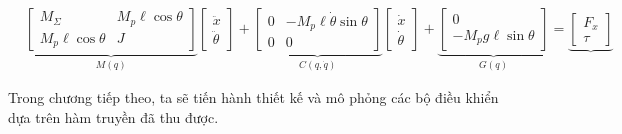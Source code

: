            \begin{align*}
                &\underbrace{
                \begin{bmatrix}
                M_\Sigma & M_p \ell \cos \theta\\
                M_p \ell  \cos \theta & J
                \end{bmatrix}
                }_{M(q)}
                \begin{bmatrix}
                \ddot{x} \\ \ddot{\theta}
                \end{bmatrix}
                +
                \underbrace{
                \begin{bmatrix}
                0 & -M_p \ell \dot{\theta} \sin \theta \\
                0 & 0
                \end{bmatrix}
                }_{C(q, \dot{q})}
                \begin{bmatrix}
                \dot{x} \\ \dot{\theta}
                \end{bmatrix} 
                +
                \underbrace{
                \begin{bmatrix}
                0 \\
                -M_p g \ell \sin \theta
                \end{bmatrix}
                }_{G(q)}
                =
                \underbrace{
                \begin{bmatrix}
                F_x \\
                \tau
                \end{bmatrix}
                }
            \end{align*}
        
        Trong chương tiếp theo, ta sẽ tiến hành thiết kế và mô phỏng các bộ điều khiển dựa trên hàm truyền đã thu được.
            
        
       